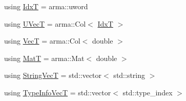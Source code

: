 \begin{DoxyCompactItemize}
\item 
using \hyperlink{namespaceprior__hessian_aa8d589f74e88bfa3b5750118acd1ab78}{IdxT} = arma\+::uword
\item 
using \hyperlink{namespaceprior__hessian_a1dddd04f1dc39e5790229a485728a48f}{U\+VecT} = arma\+::\+Col$<$ \hyperlink{namespaceprior__hessian_aa8d589f74e88bfa3b5750118acd1ab78}{IdxT} $>$
\item 
using \hyperlink{namespaceprior__hessian_a0b42fc70dec525d83fb2ac155d9ab974}{VecT} = arma\+::\+Col$<$ double $>$
\item 
using \hyperlink{namespaceprior__hessian_aab58331a34ed4ef22b6022564fe74be3}{MatT} = arma\+::\+Mat$<$ double $>$
\item 
using \hyperlink{namespaceprior__hessian_a61fc0176249462ee94fe3cca92cf3f8c}{String\+VecT} = std\+::vector$<$ std\+::string $>$
\item 
using \hyperlink{namespaceprior__hessian_acfdf544db12888f88bafb2e671841352}{Type\+Info\+VecT} = std\+::vector$<$ std\+::type\+\_\+index $>$
\end{DoxyCompactItemize}
